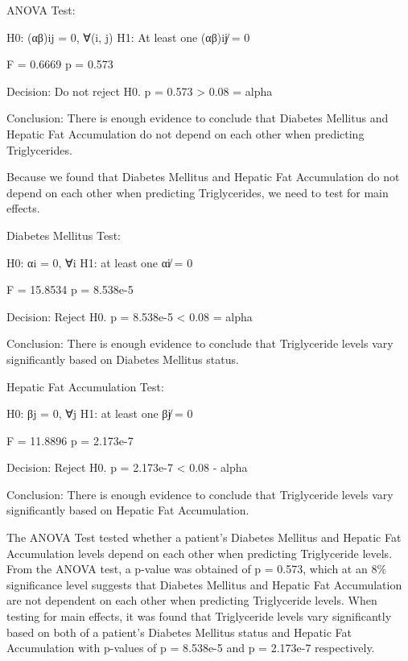 \documentclass[
]{article}
\begin{document}
ANOVA Test:

H0: (αβ)ij = 0, ∀(i, j) H1: At least one (αβ)ij̸ = 0

F = 0.6669 p = 0.573

Decision: Do not reject H0. p = 0.573 \textgreater{} 0.08 = alpha

Conclusion: There is enough evidence to conclude that Diabetes Mellitus
and Hepatic Fat Accumulation do not depend on each other when predicting
Triglycerides.

Because we found that Diabetes Mellitus and Hepatic Fat Accumulation do
not depend on each other when predicting Triglycerides, we need to test
for main effects.

Diabetes Mellitus Test:

H0: αi = 0, ∀i H1: at least one αi̸ = 0

F = 15.8534 p = 8.538e-5

Decision: Reject H0. p = 8.538e-5 \textless{} 0.08 = alpha

Conclusion: There is enough evidence to conclude that Triglyceride
levels vary significantly based on Diabetes Mellitus status.

Hepatic Fat Accumulation Test:

H0: βj = 0, ∀j H1: at least one βj̸ = 0

F = 11.8896 p = 2.173e-7

Decision: Reject H0. p = 2.173e-7 \textless{} 0.08 - alpha

Conclusion: There is enough evidence to conclude that Triglyceride
levels vary significantly based on Hepatic Fat Accumulation.

The ANOVA Test tested whether a patient's Diabetes Mellitus and Hepatic
Fat Accumulation levels depend on each other when predicting
Triglyceride levels. From the ANOVA test, a p-value was obtained of p =
0.573, which at an 8\% significance level suggests that Diabetes
Mellitus and Hepatic Fat Accumulation are not dependent on each other
when predicting Triglyceride levels. When testing for main effects, it
was found that Triglyceride levels vary significantly based on both of a
patient's Diabetes Mellitus status and Hepatic Fat Accumulation with
p-values of p = 8.538e-5 and p = 2.173e-7 respectively.
\end{document}
